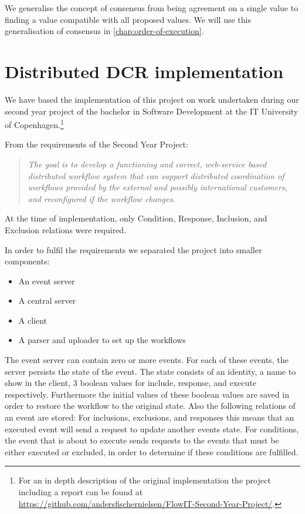         \newpar We generalise the concept of consensus from being agreement on a single value to finding a value compatible with all proposed values. We will use this generalisation of consensus in \autoref{chap:order-of-execution}.
		
	\section{Distributed DCR implementation}
		We have based the implementation of this project on work undertaken during our second year project of the bachelor in Software Development at the IT University of Copenhagen.\footnote{For an in depth description of the original implementation the project including a report can be found at \url{https://github.com/andersfischernielsen/FlowIT-Second-Year-Project/}.}
		
		\newpar From the requirements of the Second Year Project:
		
		\begin{quotation}
			\noindent\textit{The goal is to develop a functioning and correct, web-service based distributed workflow system that can support distributed coordination of workflows provided by the external and possibly international customers, and reconfigured if the workflow changes.}
		\end{quotation}
		
		\newpar At the time of implementation, only Condition, Response, Inclusion, and Exclusion relations were required.
		
		\newpar In order to fulfil the requirements we separated the project into smaller components:
		
		\begin{itemize}
			\item An event server
			\item A central server
			\item A client
			\item A parser and uploader to set up the workflows
		\end{itemize}
		
		\newpar The event server can contain zero or more events. For each of these events, the server persists the state of the event. The state consists of an identity, a name to show in the client, 3 boolean values for include, response, and execute respectively. Furthermore the initial values of these boolean values are saved in order to restore the workflow to the original state. Also the following relations of an event are stored: For inclusions, exclusions, and responses this means that an executed event will send a request to update another events state. For conditions, the event that is about to execute sends requests to the events that must be either executed or excluded, in order to determine if these conditions are fulfilled.
		
